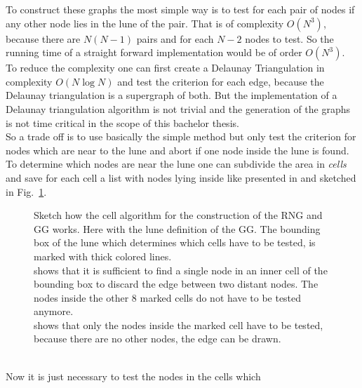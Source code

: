     To construct these graphs the most simple way is to test for each
    pair of nodes if any other node lies in
    the lune of the pair. That is of complexity \(O (N^3)\), because
    there are \(N(N-1)\) pairs and for each \(N-2\) nodes to test. So
    the running time of a straight forward implementation would be of
    order \(O(N^3)\).\\
    To reduce the complexity one can first create a Delaunay
    Triangulation in complexity \(O (N \log N)\)
    \cite{RNGCell} and test the criterion for each edge, because
    the Delaunay triangulation is a supergraph of both. But the
    implementation of a Delaunay triangulation algorithm is not trivial
    and the generation of the graphs is not time critical in the scope
    of this bachelor thesis.\\
    So a trade off is to use basically the simple method but only test
    the criterion for nodes which are near to the lune and abort if
    one node inside the lune is found. To determine which nodes are
    near the lune one can subdivide the area in \emph{cells} and save
    for each cell a list with nodes lying inside like presented in
    \cite{RNGCell} and sketched in Fig.\ \ref{fig:cell}.
    \begin{figure}[htbp]
        \centering
        \caption[Sketch how the Cell Method works]
        {
            Sketch how the cell algorithm for the construction of the
            RNG and GG works. Here with the lune definition of the GG.
            The bounding box of the lune which determines which cells have
            to be tested, is marked with thick colored lines.\\
             shows that it is sufficient to find a
            single node in an inner cell of the bounding box to discard
            the edge between two distant nodes. The nodes inside the
            other 8 marked cells do not have to be tested anymore.\\
             shows that only the nodes inside the
            marked cell have to be tested, because there are no other nodes,
            the edge can be drawn.
        }
        \label{fig:cell}
    \end{figure}\\
    Now it is just necessary to test the nodes in the cells which
